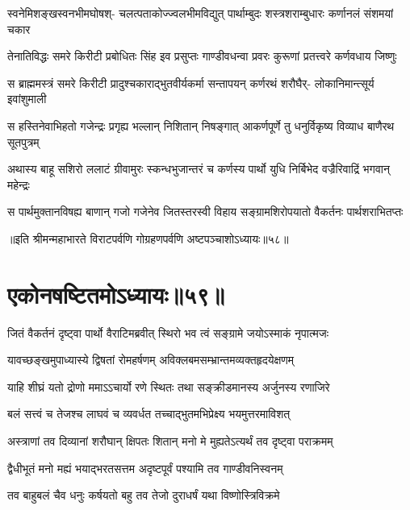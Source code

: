\fourlineindentedshloka
{स्वनेमिशङ्खस्वनभीमघोषश्-}
{चलत्पताकोज्ज्वलभीमविद्युत्}
{पार्थाम्बुदः शस्त्रशराम्बुधारः}
{कर्णानलं संशमयां चकार}


\fourlineindentedshloka
{तेनातिविद्धः समरे किरीटी}
{प्रबोधितः सिंह इव प्रसुप्तः}
{गाण्डीवधन्वा प्रवरः कुरूणां}
{प्रतत्त्वरे कर्णवधाय जिष्णुः}


\fourlineindentedshloka
{स ब्राह्ममस्त्रं समरे किरीटी}
{प्रादुश्चकाराद्भुतवीर्यकर्मा}
{सन्तापयन् कर्णरथं शरौघैर्-}
{लोकानिमान्त्सूर्य इवांशुमाली}


\fourlineindentedshloka
{स हस्तिनेवाभिहतो गजेन्द्रः}
{प्रगृह्य भल्लान् निशितान् निषङ्गात्}
{आकर्णपूर्णे तु धनुर्विकृष्य}
{विव्याध बाणैरथ सूतपुत्रम्}


\fourlineindentedshloka
{अथास्य बाहू सशिरो ललाटं}
{ग्रीवामुरः स्कन्धभुजान्तरं च}
{कर्णस्य पार्थो युधि निर्बिभेद}
{वज्रैरिवाद्रिं भगवान् महेन्द्रः}


\fourlineindentedshloka
{स पार्थमुक्तानविषह्य बाणान्}
{गजो गजेनेव जितस्तरस्वी}
{विहाय सङ्ग्रामशिरोपयातो}
{वैकर्तनः पार्थशराभितप्तः}

॥इति श्रीमन्महाभारते विराटपर्वणि गोग्रहणपर्वणि अष्टपञ्चाशोऽध्यायः॥५८॥

\chapter{एकोनषष्टितमोऽध्यायः॥५९॥}

\twolineshloka
{जितं वैकर्तनं दृष्ट्वा पार्थो वैराटिमब्रवीत्}
{स्थिरो भव त्वं सङ्ग्रामे जयोऽस्माकं नृपात्मजः}


\twolineshloka
{यावच्छङ्खमुपाध्यास्ये द्विषतां रोमहर्षणम्}
{अविक्लबमसम्भ्रान्तमव्यक्तहृदयेक्षणम्}



\twolineshloka
{याहि शीघ्रं यतो द्रोणो ममाऽऽचार्यो रणे स्थितः}
{तथा सङ्क्रीडमानस्य अर्जुनस्य रणाजिरे}


\twolineshloka
{बलं सत्त्वं च तेजश्च लाघवं च व्यवर्धत}
{तच्चाद्भुतमभिप्रेक्ष्य भयमुत्तरमाविशत्}


\twolineshloka
{अस्त्राणां तव दिव्यानां शरौघान् क्षिपतः शितान्}
{मनो मे मुह्यतेऽत्यर्थं तव दृष्ट्वा पराक्रमम्}


\twolineshloka
{द्वैधीभूतं मनो मह्यं भयाद्भरतसत्तम}
{अदृष्टपूर्वं पश्यामि तव गाण्डीवनिस्वनम्}


\twolineshloka
{तव बाहुबलं चैव धनुः कर्षयतो बहु}
{तव तेजो दुराधर्षं यथा विष्णोस्त्रिविक्रमे}



